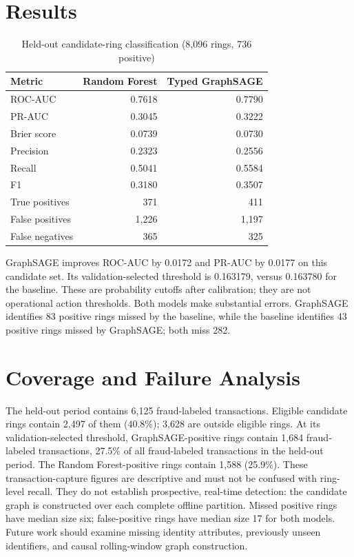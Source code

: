 \documentclass[conference]{IEEEtran}
\begin{document}
\section{Results}
\begin{table}[t]
\caption{Held-out candidate-ring classification (8,096 rings, 736 positive)}
\label{tab:results}
\centering
\begin{tabular}{lrr}
\toprule
Metric & Random Forest & Typed GraphSAGE \\
\midrule
ROC-AUC & 0.7618 & 0.7790 \\
PR-AUC & 0.3045 & 0.3222 \\
Brier score & 0.0739 & 0.0730 \\
Precision & 0.2323 & 0.2556 \\
Recall & 0.5041 & 0.5584 \\
F1 & 0.3180 & 0.3507 \\
True positives & 371 & 411 \\
False positives & 1,226 & 1,197 \\
False negatives & 365 & 325 \\
\bottomrule
\end{tabular}
\end{table}

GraphSAGE improves ROC-AUC by 0.0172 and PR-AUC by 0.0177 on this candidate set. Its validation-selected threshold is 0.163179, versus 0.163780 for the baseline. These are probability cutoffs after calibration; they are not operational action thresholds. Both models make substantial errors. GraphSAGE identifies 83 positive rings missed by the baseline, while the baseline identifies 43 positive rings missed by GraphSAGE; both miss 282.

\section{Coverage and Failure Analysis}
The held-out period contains 6,125 fraud-labeled transactions. Eligible candidate rings contain 2,497 of them (40.8\%); 3,628 are outside eligible rings. At its validation-selected threshold, GraphSAGE-positive rings contain 1,684 fraud-labeled transactions, 27.5\% of all fraud-labeled transactions in the held-out period. The Random Forest-positive rings contain 1,588 (25.9\%). These transaction-capture figures are descriptive and must not be confused with ring-level recall. They do not establish prospective, real-time detection: the candidate graph is constructed over each complete offline partition. Missed positive rings have median size six; false-positive rings have median size 17 for both models. Future work should examine missing identity attributes, previously unseen identifiers, and causal rolling-window graph construction.
\end{document}
